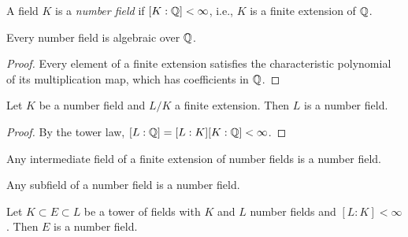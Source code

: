 
\begin{definition}
  \label{def:number-field}
  \leanok
  A field $K$ is a \emph{number field} if $[K : \mathbb{Q}] < \infty$, i.e., $K$
  is a finite extension of $\mathbb{Q}$.
\end{definition}

\begin{proposition}
  \label{prop:number-field-algebraic}
  \leanok
  Every number field is algebraic over $\mathbb{Q}$.
\end{proposition}
\begin{proof}
  \leanok
  Every element of a finite extension satisfies the characteristic polynomial
  of its multiplication map, which has coefficients in $\mathbb{Q}$.
\end{proof}

\begin{proposition}
  \label{prop:finite-ext-number-field}
  \leanok
  Let $K$ be a number field and $L/K$ a finite extension. Then $L$ is a
  number field.
\end{proposition}
\begin{proof}
  \leanok
  By the tower law, $[L : \mathbb{Q}] = [L : K][K : \mathbb{Q}] < \infty$.
\end{proof}

\begin{corollary}
  \label{cor:intermediate-field-number-field}
  \leanok
  Any intermediate field of a finite extension of number fields is a number
  field.
\end{corollary}

\begin{corollary}
  \label{cor:subfield-number-field}
  \leanok
  Any subfield of a number field is a number field.
\end{corollary}

\begin{corollary}
  \label{cor:tower-number-field}
  \leanok
  Let $K \subset E \subset L$ be a tower of fields with $K$ and $L$ number
  fields and $[L:K] < \infty$. Then $E$ is a number field.
\end{corollary}

